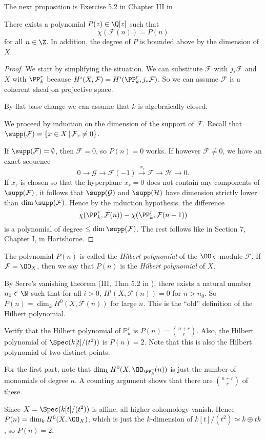 \documentclass[11pt, english]{article}
\begin{document}
The next proposition is Exercise 5.2 in Chapter III in \cite{hartshorne}. 

\begin{prop}
There exists a polynomial $P(z) \in \Q[z]$ such that
\[
\chi(\mathcal F(n)) = P(n)
\]
for all $n \in \Z$. In addition, the degree of $P$ is bounded above by the dimension of $X$. 
\end{prop}
\begin{proof}
We start by simplifying the situation. We can substitute $\mathcal F$ with $j_\ast \mathcal F$ and $X$ with $\PP_k^r$ because $H^i(X, \mathcal F)=H^i(\PP_k^r, j_\ast \mathcal F)$. So we can assume $\mathcal F$ is a coherent sheaf on projective space.

By flat base change we can assume that $k$ is algebraically closed.

We proceed by induction on the dimension of the support of $\mathcal F$. Recall that $\supp(\mathcal F)= \{ x \in X \, | \, \mathcal F_x \neq 0 \}$.

If $\supp(\mathcal F)=\emptyset$, then $\mathcal F = 0$, so $P(n)=0$ works.  If however $\mathcal F \neq 0$, we have an exact sequence
\[
0 \to \mathcal G \to \mathcal F(-1) \xrightarrow{\cdot x_r} \mathcal F \to \mathcal H \to 0.
\]
If $x_r$ is chosen so that the hyperplane $x_r=0$ does not contain any components of $\supp(\mathcal F)$, it follows that $\supp(\mathcal G)$ and $\supp(\mathcal H)$ have dimension strictly lower than $\dim \supp(\mathcal F)$. Hence by the induction hypothesis, the difference
\[
\chi(\PP_k^r, \mathcal F(n)) - \chi(\PP_k^r, \mathcal F(n-1))
\]
is a polynomial of degree $\leq \dim \supp(\mathcal F)$. The rest follows like in Section 7, Chapter I, in Hartshorne.
\end{proof}

The polynomial $P(n)$ is called the \emph{Hilbert polynomial} of the $\OO_X$-module $\mathcal F$. If $\mathcal F= \OO_X$, then we say that $P(n)$ is the \emph{Hilbert polynomial} of $X$.

By Serre's vanishing theorem (III, Thm 5.2 in \cite{hartshorne}), there exists a natural number $n_0 \in \N$ such that for all $i > 0$, $H^i(X, \mathcal F(n)) = 0$ for $n > n_0$. So $P(n)= \dim_k H^0(X, \mathcal F(n))$ for large $n$. This is the ``old'' definition of the Hilbert polynomial.

\begin{exc}
Verify that the Hilbert polynomial of $\mathbb P_k^r$ is $P(n) = \binom{n+r}{r}$. Also, the Hilbert polynomial of $\Spec(k[t]/(t^2))$ is $P(n)=2$. Note that this is also the Hilbert polynomial of two distinct points. 
\end{exc}
\begin{sol}
For the first part, note that $\dim_k H^0(X, \OO_{\PP_k^r}(n))$ is just the number of monomials of degree $n$. A counting argument shows that there are $\binom{n+r}{r}$ of these.

Since $X= \Spec(k[t]/(t^2))$ is affine, all higher cohomology vanish. Hence $P(n) = \dim_k H^0(X,\OO_X)$, which is just the $k$-dimension of $k[t]/(t^2) \simeq k \oplus tk$, so $P(n)=2$. 
\end{sol}
\end{document}
